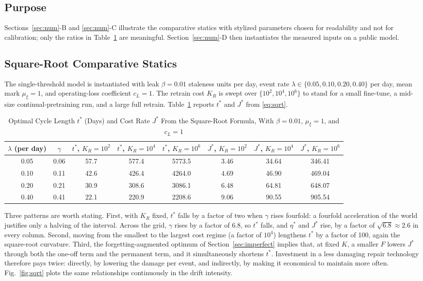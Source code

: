 \documentclass[journal]{IEEEtran}
\begin{document}
\subsection{Purpose}
Sections~\ref{sec:num}-B and \ref{sec:num}-C illustrate the comparative statics with stylized parameters chosen for readability and not for calibration; only the ratios in Table~\ref{tab:sqrt} are meaningful. Section~\ref{sec:num}-D then instantiates the measured inputs on a public model.

\subsection{Square-Root Comparative Statics}
The single-threshold model is instantiated with leak $\beta=0.01$ staleness units per day, event rate $\lambda\in\{0.05,0.10,0.20,0.40\}$ per day, mean mark $\mu_\xi=1$, and operating-loss coefficient $c_L=1$. The retrain cost $K_R$ is swept over $\{10^2,10^4,10^6\}$ to stand for a small fine-tune, a mid-size continual-pretraining run, and a large full retrain. Table~\ref{tab:sqrt} reports $t^\ast$ and $J^\ast$ from \eqref{eq:sqrt}.

\begin{table}[t]
\caption{Optimal Cycle Length $t^\ast$ (Days) and Cost Rate $J^\ast$ From the Square-Root Formula, With $\beta=0.01$, $\mu_\xi=1$, and $c_L=1$}\label{tab:sqrt}
\centering
\footnotesize
\begin{tabular}{cccccccc}
\toprule
$\lambda$ (per day) & $\gamma$ & $t^\ast$, $K_R\!=\!10^2$ & $t^\ast$, $K_R\!=\!10^4$ & $t^\ast$, $K_R\!=\!10^6$ & $J^\ast$, $K_R\!=\!10^2$ & $J^\ast$, $K_R\!=\!10^4$ & $J^\ast$, $K_R\!=\!10^6$\\
\midrule
0.05 & 0.06 & 57.7 & 577.4 & 5773.5 & 3.46 & 34.64 & 346.41\\
0.10 & 0.11 & 42.6 & 426.4 & 4264.0 & 4.69 & 46.90 & 469.04\\
0.20 & 0.21 & 30.9 & 308.6 & 3086.1 & 6.48 & 64.81 & 648.07\\
0.40 & 0.41 & 22.1 & 220.9 & 2208.6 & 9.06 & 90.55 & 905.54\\
\bottomrule
\end{tabular}
\end{table}

Three patterns are worth stating. First, with $K_R$ fixed, $t^\ast$ falls by a factor of two when $\gamma$ rises fourfold: a fourfold acceleration of the world justifies only a halving of the interval. Across the grid, $\gamma$ rises by a factor of 6.8, so $t^\ast$ falls, and $\eta^\ast$ and $J^\ast$ rise, by a factor of $\sqrt{6.8}\approx2.6$ in every column. Second, moving from the smallest to the largest cost regime (a factor of $10^4$) lengthens $t^\ast$ by a factor of 100, again the square-root curvature. Third, the forgetting-augmented optimum of Section~\ref{sec:imperfect} implies that, at fixed $K$, a smaller $F$ lowers $J^\ast$ through both the one-off term and the permanent term, and it simultaneously shortens $t^\ast$. Investment in a less damaging repair technology therefore pays twice: directly, by lowering the damage per event, and indirectly, by making it economical to maintain more often. Fig.~\ref{fig:sqrt} plots the same relationships continuously in the drift intensity.
\end{document}
